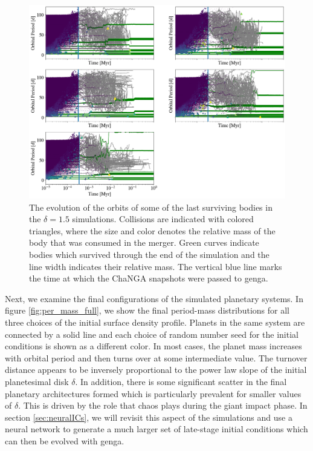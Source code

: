 \begin{figure}
\begin{center}
    \includegraphics[width=\textwidth]{figures/stip/full_coll_evo.png}
    \caption{The evolution of the orbits of some of the last surviving bodies in the $\delta = 1.5$ simulations. Collisions are indicated with colored triangles, where the size and color denotes the relative mass of the body that was consumed in the merger. Green curves indicate bodies which survived through the end of the simulation and the line width indicates their relative mass. The vertical blue line marks the time at which the {\sc ChaNGA} snapshots were passed to {\sc genga}.\label{fig:full_coll_evo}}
\end{center}
\end{figure}


Next, we examine the final configurations of the simulated planetary systems. In figure \ref{fig:per_mass_full}, we show the final period-mass distributions for all three choices of the initial surface density profile. Planets in the same system are connected by a solid line and each choice of random number seed for the initial conditions is shown as a different color. In most cases, the planet mass increases with orbital period and then turns over at some intermediate value. The turnover distance appears to be inversely proportional to the power law slope of the initial planetesimal disk $\delta$. In addition, there is some significant scatter in the final planetary architectures formed which is particularly prevalent for smaller values of $\delta$. This is driven by the role that chaos plays during the giant impact phase. In section \ref{sec:neuralICs}, we will revisit this aspect of the simulations and use a neural network to generate a much larger set of late-stage initial conditions which can then be evolved with {\sc genga}.

